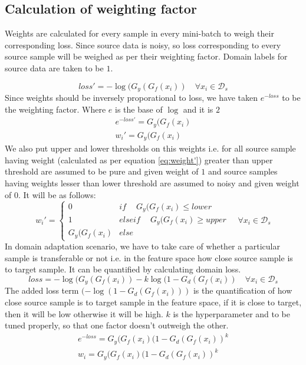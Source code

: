 \subsection{Calculation of weighting factor}
Weights are calculated for every sample in every mini-batch to weigh their corresponding loss. Since source data is noisy, so loss corresponding to every source sample will be weighed as per their weighting factor. Domain labels for source data are taken to be $1$.

\begin{equation*}
    loss' = -\log(G_y(G_f(x_i)) \quad \forall x_i \in \mathcal{D}_s
\end{equation*}
Since weights should be inversely proporational to loss, we have taken $e^{-loss}$ to be the weighting factor. Where $e$ is the base of $\log$ and it is $2$
\begin{equation}
\label{eq:weight'}
\begin{align}
    e^{-loss'} = G_y(G_f(x_i)\\
    w_{i}' =     G_y(G_f(x_i)
\end{align}
\end{equation}
We also put upper and lower thresholds on this weights i.e. for all source sample having weight (calculated as per equation \ref{eq:weight'}) greater than upper threshold are assumed to be pure and given weight of $1$ and source samples having weights lesser than lower threshold are assumed to noisy and given weight of $0$. It will be as follows:
\begin{equation*}
                w_{i}' = \begin{cases}
		            0 & if\ \quad G_y(G_f(x_i) \le lower \\
		            1 & elseif\ \quad G_y(G_f(x_i) \ge upper \\
		            G_y(G_f(x_i) & else\ 
		            \end{cases} \quad \forall x_i \in \mathcal{D}_s
\end{equation*}
In domain adaptation scenario, we have to take care of whether a particular sample is transferable or not i.e. in the feature space how close source sample is to target sample. It can be quantified by calculating domain loss.
\begin{equation}
    loss = -\log(G_y(G_f(x_i)) - k \log(1 - G_d(G_f(x_i)) \quad \forall x_i \in \mathcal{D}_s
\end{equation}
The added loss term $(-\log(1 - G_d(G_f(x_i)))$ is the quantification of how close source sample is to target sample in the feature space, if it is close to target, then it will be low otherwise it will be high. $k$ is the hyperparameter and to be tuned properly, so that one factor doesn't outweigh the other.
\begin{equation}
\begin{align}
    e^{-loss} = G_y(G_f(x_i)(1 - G_d(G_f(x_i))^k\\
    w_{i} =     G_y(G_f(x_i)(1 - G_d(G_f(x_i))^k
\end{align}
\end{equation}

